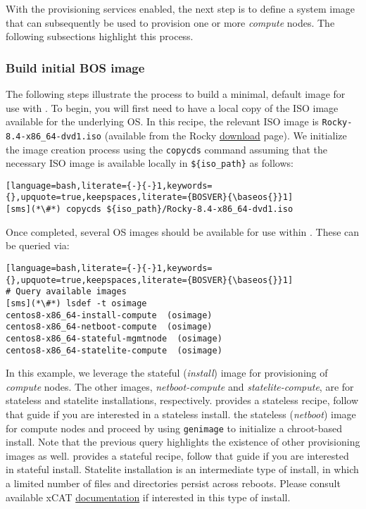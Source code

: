 
With the provisioning services enabled, the next step is to define
a system image that can subsequently be
used to provision one or more {\em compute} nodes. The following subsections highlight this process.

\subsubsection{Build initial BOS image} \label{sec:assemble_bos}
The following steps illustrate the process to build a minimal, default image for use with \xCAT{}. To begin, you will
first need to have a local copy of the ISO image available for the underlying OS. In this recipe, the relevant ISO image
is \texttt{Rocky-8.4-x86\_64-dvd1.iso} (available from the Rocky
\href{https://rockylinux.org/download/}{\color{blue}download} page).
We initialize the image
creation process using the \texttt{copycds} command assuming that the necessary ISO image is available locally in 
\texttt{\$\{iso\_path\}} as follows:

\begin{lstlisting}[language=bash,literate={-}{-}1,keywords={},upquote=true,keepspaces,literate={BOSVER}{\baseos{}}1]
[sms](*\#*) copycds ${iso_path}/Rocky-8.4-x86_64-dvd1.iso
\end{lstlisting}

\noindent Once completed, several OS images should be available for use within \xCAT{}. These can be queried via:

\begin{lstlisting}[language=bash,literate={-}{-}1,keywords={},upquote=true,keepspaces,literate={BOSVER}{\baseos{}}1]
# Query available images
[sms](*\#*) lsdef -t osimage
centos8-x86_64-install-compute  (osimage)
centos8-x86_64-netboot-compute  (osimage)
centos8-x86_64-stateful-mgmtnode  (osimage)
centos8-x86_64-statelite-compute  (osimage)
\end{lstlisting}

In this example, we leverage
the stateful ({\em install}) image for provisioning of {\em
compute} nodes.  The other images, {\em
netboot-compute} and {\em statelite-compute}, are for stateless and statelite
installations, respectively. \OHPC{} provides a stateless \xCAT{} recipe,
follow that guide if you are interested in a stateless install.
\else
the stateless ({\em netboot}) image for compute nodes and proceed by using
\texttt{genimage} to initialize a chroot-based install. Note that the previous query highlights the existence of other
provisioning images as well. \OHPC{} provides a stateful \xCAT{} recipe, 
follow that guide if you are interested in  stateful install.
\fi
Statelite installation is an intermediate type of install, in which a limited
number of files and directories persist across reboots.  Please consult
available xCAT \href{https://xcat-docs.readthedocs.io/en/stable/}{\color{blue}
documentation} if interested in this type of install.
